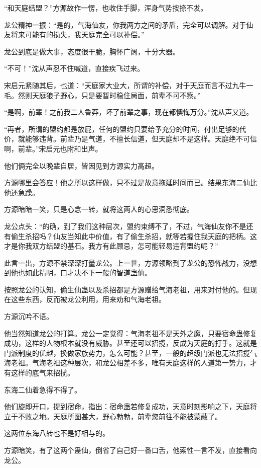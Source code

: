 \begin{this_body}
“和天庭结盟？”方源故作一愣，也收住手脚，浑身气势按捺不发。

龙公精神一振：“是的，气海仙友，你我两方之间的矛盾，完全可以调解。对于仙友将来可能有的损失，我天庭完全可以补偿。”

龙公到底是做大事，态度很干脆，胸怀广阔，十分大器。

“不可！”沈从声忍不住喊道，直接疾飞过来。

宋启元紧随其后，也道：“天庭家大业大，所谓的补偿，对于天庭而言不过九牛一毛。然则天庭狼子野心，只是要暂时稳住局面，前辈不可不察。”

“是啊，前辈！之前我二人鲁莽，坏了前辈之事，现在都懊悔万分。”沈从声又道。

“再者，所谓的盟约都是放屁，任何的盟约只要给予充分的时间，付出足够的代价，就能够违背。前辈乃是气道，不擅长信道，但天庭却不是这样。天庭绝不可信啊，前辈。”宋启元也附和出声。

他们俩完全以晚辈自居，皆因见到方源实力高超。

方源哪里会答应！他之所以这样做，只不过是故意拖延时间而已。结果东海二仙比他还急躁。

方源暗暗一笑，只是心念一转，就将这两人的心思洞悉彻底。

龙公点头：“的确，到了我们这种层次，盟约束缚不了，不过，气海仙友你不是还有偷生杀招吗？仙友当知此中价值，有了偷生杀招，就等若握住我天庭的把柄。这才是你我双方结盟的基石。我方有此顾忌，怎可能轻易违背盟约呢？”

此言一出，方源不禁深深打量龙公。上一世，方源领略到了龙公的恐怖战力，没想到他也如此精明，口才决不下一般的智道蛊仙。

按照龙公的认知，偷生仙蛊以及杀招都是方源赠给气海老祖，用来对付他的。但现在这些东西，反而被龙公利用，用来劝和气海老祖。

方源沉吟不语。

他当然知道龙公的打算。龙公一定觉得：气海老祖不是天外之魔，只要宿命蛊修复成功，这样的人物根本就没有威胁。甚至还可以招揽，反成为天庭的打手。这就是门派制度的优越，换做家族势力，怎么可能？甚至，一般的超级门派也无法招揽气海老祖。气海老祖这种层次，和龙公相差不多，唯有天庭这样的人道第一势力，才有这样的底气来招揽。

东海二仙着急得不得了。

他们旋即开口，提到宿命，指出：宿命蛊若修复成功，天意时刻影响之下，天庭将立于不败之地。天庭所图甚大，野心勃勃，前辈您前往不能被蒙蔽了。

这两位东海八转也不是好相与的。

方源暗笑，有了这两个蛊仙，倒省了自己好一番口舌，他索性一言不发，直接看向龙公。


\end{this_body}
